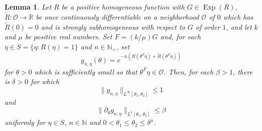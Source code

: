 \documentclass[11pt, letter]{book}
\newtheorem{lemma}[theorem]{Lemma}
\newcommand\Exp{\operatorname{Exp}}
\begin{document}
\begin{framed}
\begin{lemma}\label{lem:AmplitudeSobolevEstimates}
Let $R$ be a positive homogeneous function with $G\in\Exp(R)$, $\widetilde{R}:\mathcal{O}\to\mathbb{R}$ be once continuously differentiable on a neighborhood $\mathcal{O}$ of $0$ which has $\widetilde{R}(0)=0$ and is strongly subhomogeneous with respect to $G$ of order $1$, and let $k$ and $\mu$ be positive real numbers. Set $F=(k/\mu) G$ and, for each $\eta\in S=\{\eta:R(\eta)=1\}$ and $n\in\mathbb{N}_+$, set
\begin{equation*}
    g_{n,\eta}(\theta)=e^{-n\left(R\left(\theta^F\eta\right)+\widetilde{R}\left(\theta^F\eta\right)\right)}
\end{equation*}
for $\theta>0$ which is sufficiently small so that $\theta^F\eta\in\mathcal{O}$. Then, for each $\beta>1$, there is $\delta>0$ for which 
\begin{equation*}
    \|g_{n,\eta}\|_{L^\infty[\theta_1,\theta_2]}\leq 1
\end{equation*}
and
\begin{equation*}
    \|\partial_\theta g_{n,\eta}\|_{L^1[\theta_1,\theta_2]}\leq \beta
\end{equation*}
uniformly for $\eta\in S$, $n\in\mathbb{N}$ and $0<\theta_1\leq\theta_2\leq \delta^{\mu}$.
\end{lemma}
\end{framed}
\end{document}

